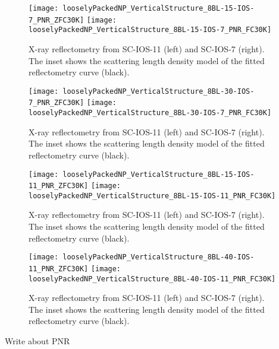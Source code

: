 \documentclass[\main/dresen_thesis.tex]{subfiles}
\begin{document}
  \label{sec:looselyPackedNS:bilayerStacks:pnr}
  \begin{figure}[tb]
    \centering
    \texttt{[image: looselyPackedNP\_VerticalStructure\_8BL-15-IOS-7\_PNR\_ZFC30K]}
    \texttt{[image: looselyPackedNP\_VerticalStructure\_8BL-15-IOS-7\_PNR\_FC30K]}
    \caption{\label{fig:looselyPackedNP:bilayer:pnr:8BL-15-IOS7}X-ray reflectometry from SC-IOS-11 (left) and SC-IOS-7 (right). The inset shows the scattering length density model of the fitted reflectometry curve (black).}
  \end{figure}

  \begin{figure}[tb]
    \centering
    \texttt{[image: looselyPackedNP\_VerticalStructure\_8BL-30-IOS-7\_PNR\_ZFC30K]}
    \texttt{[image: looselyPackedNP\_VerticalStructure\_8BL-30-IOS-7\_PNR\_FC30K]}
    \caption{\label{fig:looselyPackedNP:bilayer:pnr:8BL-15-IOS7}X-ray reflectometry from SC-IOS-11 (left) and SC-IOS-7 (right). The inset shows the scattering length density model of the fitted reflectometry curve (black).}
  \end{figure}

  \begin{figure}[tb]
    \centering
    \texttt{[image: looselyPackedNP\_VerticalStructure\_8BL-15-IOS-11\_PNR\_ZFC30K]}
    \texttt{[image: looselyPackedNP\_VerticalStructure\_8BL-15-IOS-11\_PNR\_FC30K]}
    \caption{\label{fig:looselyPackedNP:bilayer:pnr:8BL-15-IOS7}X-ray reflectometry from SC-IOS-11 (left) and SC-IOS-7 (right). The inset shows the scattering length density model of the fitted reflectometry curve (black).}
  \end{figure}

  \begin{figure}[tb]
    \centering
    \texttt{[image: looselyPackedNP\_VerticalStructure\_8BL-40-IOS-11\_PNR\_ZFC30K]}
    \texttt{[image: looselyPackedNP\_VerticalStructure\_8BL-40-IOS-11\_PNR\_FC30K]}
    \caption{\label{fig:looselyPackedNP:bilayer:pnr:8BL-15-IOS7}X-ray reflectometry from SC-IOS-11 (left) and SC-IOS-7 (right). The inset shows the scattering length density model of the fitted reflectometry curve (black).}
  \end{figure}

  Write about PNR
\end{document}
